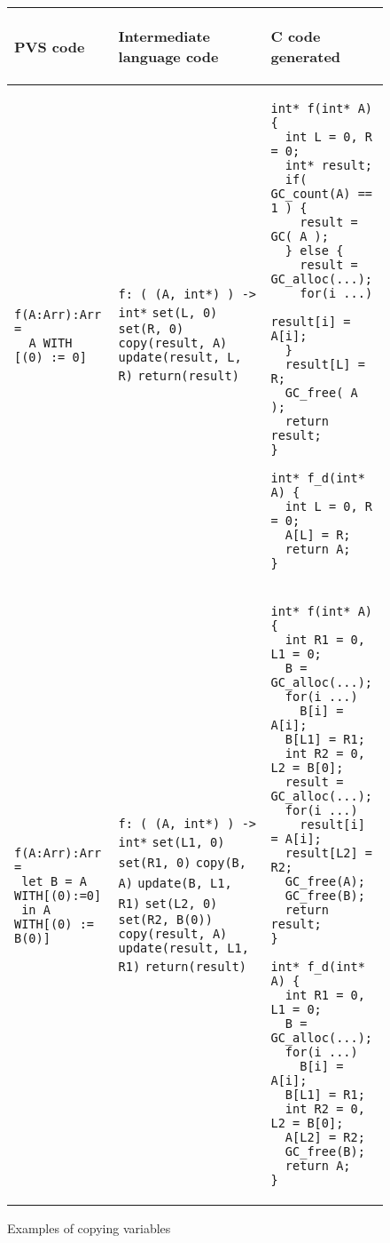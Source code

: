\documentclass[12pt,a4paper]{article}
\newcommand{\cl}[1]{\texttt{#1}}
\begin{document}
\begin{figure}[!ht]
\begin{tabular}{|p{5.5cm}|p{5.5cm}|p{6cm}|}
\hline
\begin{center}
PVS code
\end{center} &
\begin{center}
Intermediate language code
\end{center} &
\begin{center}
C code generated
\end{center} \\ \hline

\begin{lstlisting}
f(A:Arr):Arr =
  A WITH [(0) := 0]
\end{lstlisting} &
\cl{f: ( (A, int*) ) -> int*} \newline
\cl{set(L, 0)} \newline
\cl{set(R, 0)} \newline
\cl{copy(result, A)} \newline
\cl{update(result, L, R)} \newline
\cl{return(result)} &
\begin{lstlisting}
int* f(int* A) {
  int L = 0, R = 0;
  int* result;
  if( GC_count(A) == 1 ) {
    result = GC( A );
  } else {
    result = GC_alloc(...);
    for(i ...)
      result[i] = A[i];
  }
  result[L] = R;
  GC_free( A );
  return result;
}

int* f_d(int* A) {
  int L = 0, R = 0;
  A[L] = R;
  return A;
}
\end{lstlisting} \\ \hline

\begin{lstlisting}
f(A:Arr):Arr =
 let B = A WITH[(0):=0]
 in A WITH[(0) := B(0)]
\end{lstlisting} &
\cl{f: ( (A, int*) ) -> int*} \newline
\cl{set(L1, 0)} \newline
\cl{set(R1, 0)} \newline
\cl{copy(B, A)} \newline
\cl{update(B, L1, R1)} \newline
\cl{set(L2, 0)} \newline
\cl{set(R2, B(0))} \newline
\cl{copy(result, A)} \newline
\cl{update(result, L1, R1)} \newline
\cl{return(result)} &
\begin{lstlisting}
int* f(int* A) {
  int R1 = 0, L1 = 0;
  B = GC_alloc(...);
  for(i ...)
    B[i] = A[i];
  B[L1] = R1;
  int R2 = 0, L2 = B[0];
  result = GC_alloc(...);
  for(i ...)
    result[i] = A[i];
  result[L2] = R2;
  GC_free(A);
  GC_free(B);
  return result;
}

int* f_d(int* A) {
  int R1 = 0, L1 = 0;
  B = GC_alloc(...);
  for(i ...)
    B[i] = A[i];
  B[L1] = R1;
  int R2 = 0, L2 = B[0];
  A[L2] = R2;
  GC_free(B);
  return A;
}
\end{lstlisting} \\ \hline
\end{tabular}
\caption{Examples of copying variables}
\end{figure}
\end{document}
